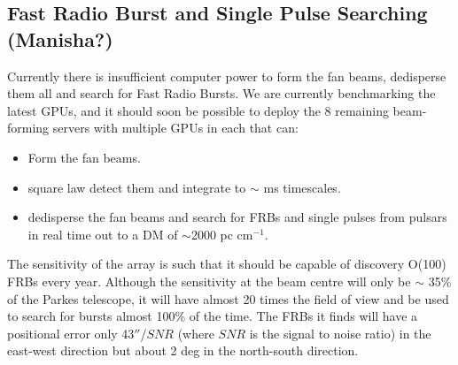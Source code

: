 \subsection{Fast Radio Burst and Single Pulse Searching (Manisha?)}

Currently there is insufficient computer power to form the fan beams, dedisperse them all and search for Fast Radio Bursts. We are currently benchmarking the latest GPUs, and it should soon be possible to deploy the 8 remaining beam-forming servers with multiple GPUs in each that can:
\begin{itemize}
\item Form the fan beams.
\item square law detect them and integrate to $\sim$ ms timescales.
\item dedisperse the fan beams and search for FRBs and single pulses from pulsars in real time out to a DM of $\sim$2000 pc cm$^{-1}$.
\end{itemize}

The sensitivity of the array is such that it should be capable of discovery O(100) FRBs every year. Although the sensitivity at the beam centre will only be $\sim$ 35\% of the Parkes telescope, it will have almost 20 times the field of view and be used to search for bursts almost 100\% of the time. The FRBs it finds will have a positional error only 43$''$/$SNR$ (where $SNR$ is the signal to noise ratio) in the east-west direction but about 2 deg in the north-south direction.